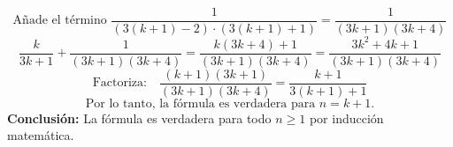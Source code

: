 \documentclass[answers]{exam}
\begin{document}
\begin{questions}
\begin{solution}
        \[
        \text{Añade el término } \frac{1}{(3(k+1)-2)\cdot(3(k+1)+1)} = \frac{1}{(3k+1)(3k+4)}
        \]
        \[
        \frac{k}{3k+1} + \frac{1}{(3k+1)(3k+4)} = \frac{k(3k+4) + 1}{(3k+1)(3k+4)} = \frac{3k^2 + 4k + 1}{(3k+1)(3k+4)}
        \]
        \[
        \text{Factoriza:} \quad \frac{(k+1)(3k+1)}{(3k+1)(3k+4)} = \frac{k+1}{3(k+1) + 1}
        \]
        \[
        \text{Por lo tanto, la fórmula es verdadera para } n = k+1.
        \]
        \textbf{Conclusión:} La fórmula es verdadera para todo \(n \geq 1\) por inducción matemática.
        \end{solution}
        
\end{questions}
\end{document}

